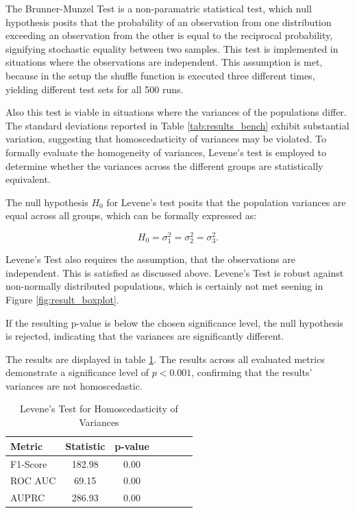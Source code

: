 The Brunner-Munzel Test is a non-paramatric statistical test, which null hypothesis posits that the probability of an observation from one distribution exceeding an observation from the other is equal to the reciprocal probability, signifying stochastic equality between two samples.
This test is implemented in situations where the observations are independent.
This assumption is met, because in the setup the shuffle function is executed three different times, yielding different test sets for all 500 runs.

Also this test is viable in situations where the variances of the populations differ.
The standard deviations reported in Table \ref{tab:results_bench} exhibit substantial variation, suggesting that homoscedasticity of variances may be violated.
To formally evaluate the homogeneity of variances, Levene's test is employed to determine whether the variances across the different groups are statistically equivalent. 


The null hypothesis $H_0$ for Levene's test posits that the population variances are equal across all groups, which can be formally expressed as:

\begin{equation}
    H_0 = \sigma_1^2 = \sigma_2^2 =  \sigma_3^2. 
\end{equation}

Levene's Test also requires the assumption, that the observations are independent.
This is satisfied as discussed above. 
Levene's Test  is robust against non-normally distributed populations, which is certainly not met seening in Figure \ref{fig:result_boxplot}.


If the resulting p-value is below the chosen significance level, the null hypothesis is rejected, indicating that the variances are significantly different.


The results are displayed in table \ref{tab:levene}.
The results across all evaluated metrics demonstrate a significance level of $p < 0.001$, confirming that the results' variances are not homoscedastic. 


\begin{table}[h]
\centering
\caption{Levene's Test for Homoscedasticity of Variances}
\label{tab:levene}
\begin{tabular}{lcccccc} 
\toprule
\textbf{Metric}         & \textbf{Statistic} & \textbf{p-value} &           \\
\midrule
F1-Score                & 182.98           & 0.00  &    \\
ROC AUC                 & 69.15            & 0.00  &    \\
AUPRC                   & 286.93           & 0.00  &    \\
\bottomrule
\end{tabular}
\end{table}

